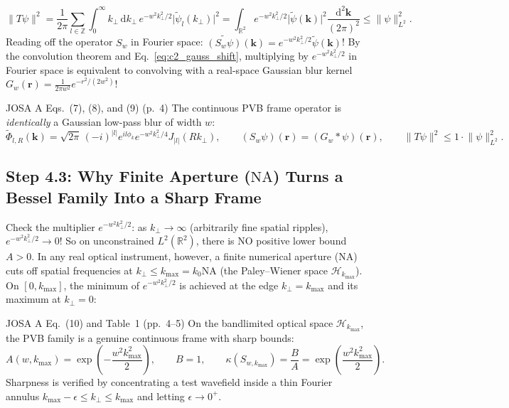 \documentclass[10pt,letterpaper]{article}
\newcommand{\norm}[1]{\lVert #1 \rVert}
\newcommand{\abs}[1]{\lvert #1 \rvert}
\newcommand{\dd}{\mathrm{d}}
\numberwithin{equation}{section}
\begin{document}
\begin{equation}
  \norm{T\psi}^2 = \frac{1}{2\pi}\sum_{l\in\mathbb{Z}}\int_0^\infty k_\perp\,\dd k_\perp\,e^{-w^2 k_\perp^2/2}\abs{\widetilde{\psi}_l(k_\perp)}^2 = \int_{\mathbb{R}^2} e^{-w^2 k_\perp^2/2}\abs{\widetilde{\psi}(\mathbf{k})}^2\frac{\dd^2\mathbf{k}}{(2\pi)^2} \le \norm{\psi}_{L^2}^2.
\end{equation}
Reading off the operator $S_w$ in Fourier space: $\widetilde{(S_w\psi)}(\mathbf{k}) = e^{-w^2 k_\perp^2/2}\widetilde{\psi}(\mathbf{k})$! By the convolution theorem and Eq.~\eqref{eq:c2_gauss_shift}, multiplying by $e^{-w^2 k_\perp^2/2}$ in Fourier space is equivalent to convolving with a real-space Gaussian blur kernel $G_w(\mathbf{r}) = \frac{1}{2\pi w^2}e^{-r^2/(2w^2)}$!

\begin{paperhit}{JOSA A Eqs.~(7), (8), and (9) (p.~4)}
The continuous PVB frame operator is \emph{identically} a Gaussian low-pass blur of width $w$:
\[
  \widetilde{\Phi}_{l,R}(\mathbf{k}) = \sqrt{2\pi}\,(-i)^{\abs{l}} e^{il\phi_k} e^{-w^2 k_\perp^2/4} J_{\abs{l}}(Rk_\perp), \qquad
  (S_w\psi)(\mathbf{r}) = (G_w * \psi)(\mathbf{r}), \qquad \norm{T\psi}^2 \le 1\cdot\norm{\psi}_{L^2}^2.
\]
\end{paperhit}

\subsection{Step 4.3: Why Finite Aperture ($\mathrm{NA}$) Turns a Bessel Family Into a Sharp Frame}

Check the multiplier $e^{-w^2 k_\perp^2/2}$: as $k_\perp \to \infty$ (arbitrarily fine spatial ripples), $e^{-w^2 k_\perp^2/2} \to 0$! So on unconstrained $L^2(\mathbb{R}^2)$, there is NO positive lower bound $A > 0$. In any real optical instrument, however, a finite numerical aperture ($\mathrm{NA}$) cuts off spatial frequencies at $k_\perp \le k_{\max} = k_0\mathrm{NA}$ (the Paley--Wiener space $\mathcal{H}_{k_{\max}}$). On $[0, k_{\max}]$, the minimum of $e^{-w^2 k_\perp^2/2}$ is achieved at the edge $k_\perp = k_{\max}$ and its maximum at $k_\perp = 0$:

\begin{paperhit}{JOSA A Eq.~(10) and Table~1 (pp.~4--5)}
On the bandlimited optical space $\mathcal{H}_{k_{\max}}$, the PVB family is a genuine continuous frame with sharp bounds:
\[
  A(w,k_{\max}) = \exp\!\left(-\frac{w^2 k_{\max}^2}{2}\right), \qquad B = 1, \qquad \kappa(S_{w,k_{\max}}) = \frac{B}{A} = \exp\!\left(\frac{w^2 k_{\max}^2}{2}\right).
\]
Sharpness is verified by concentrating a test wavefield inside a thin Fourier annulus $k_{\max} - \epsilon \le k_\perp \le k_{\max}$ and letting $\epsilon \to 0^+$.
\end{paperhit}
\end{document}
